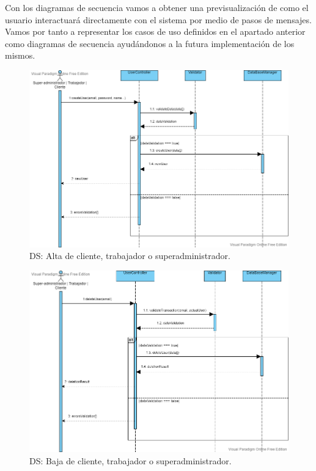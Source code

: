 Con los diagramas de secuencia vamos a obtener una previsualización de como el usuario interactuará directamente con el sistema por medio de pasos de mensajes. Vamos por tanto a representar los casos de uso definidos en el apartado anterior como diagramas de secuencia ayudándonos a la futura implementación de los mismos.

\begin{figure}[H]
  \centering
  \includegraphics[scale=0.42]{images/Alta_Usuario.png}
  \caption{DS: Alta de cliente, trabajador o superadministrador.}
  \label{DS1}
\end{figure}

\begin{figure}[H]
  \centering
  \includegraphics[scale=0.42]{images/Baja_Usuario.png}
  \caption{DS: Baja de cliente, trabajador o superadministrador.}
  \label{DS1}
\end{figure}

